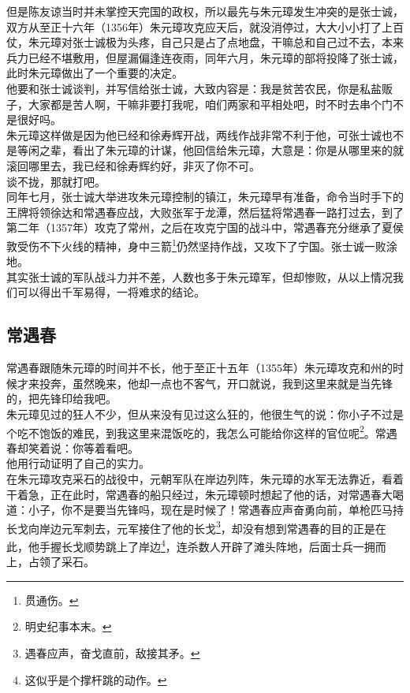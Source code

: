 \begin{multicols}{\theparacolNo}
但是陈友谅当时并未掌控天完国的政权，所以最先与朱元璋发生冲突的是张士诚，双方从至正十六年（1356年）朱元璋攻克应天后，就没消停过，大大小小打了上百仗，朱元璋对张士诚极为头疼，自己只是占了点地盘，干嘛总和自己过不去，本来兵力已经不堪敷用，但屋漏偏逢连夜雨，同年六月，朱元璋的部将投降了张士诚，此时朱元璋做出了一个重要的决定。\\

他要和张士诚谈判，并写信给张士诚，大致内容是：我是贫苦农民，你是私盐贩子，大家都是苦人啊，干嘛非要打我呢，咱们两家和平相处吧，时不时去串个门不是很好吗。\\

朱元璋这样做是因为他已经和徐寿辉开战，两线作战非常不利于他，可张士诚也不是等闲之辈，看出了朱元璋的计谋，他回信给朱元璋，大意是：你是从哪里来的就滚回哪里去，我已经和徐寿辉约好，非灭了你不可。\\

谈不拢，那就打吧。\\

同年七月，张士诚大举进攻朱元璋控制的镇江，朱元璋早有准备，命令当时手下的王牌将领徐达和常遇春应战，大败张军于龙潭，然后猛将常遇春一路打过去，到了第二年（1357年）攻克了常州，之后在攻克宁国的战斗中，常遇春充分继承了夏侯敦受伤不下火线的精神，身中三箭\footnote{贯通伤。}仍然坚持作战，又攻下了宁国。张士诚一败涂地。\\

其实张士诚的军队战斗力并不差，人数也多于朱元璋军，但却惨败，从以上情况我们可以得出千军易得，一将难求的结论。\\

\subsection{常遇春}
常遇春跟随朱元璋的时间并不长，他于至正十五年（1355年）朱元璋攻克和州的时候才来投奔，虽然晚来，他却一点也不客气，开口就说，我到这里来就是当先锋的，把先锋印给我吧。\\

朱元璋见过的狂人不少，但从来没有见过这么狂的，他很生气的说：你小子不过是个吃不饱饭的难民，到我这里来混饭吃的，我怎么可能给你这样的官位呢\footnote{明史纪事本末。}。常遇春却笑着说：你等着看吧。\\

他用行动证明了自己的实力。\\

在朱元璋攻克采石的战役中，元朝军队在岸边列阵，朱元璋的水军无法靠近，看着干着急，正在此时，常遇春的船只经过，朱元璋顿时想起了他的话，对常遇春大喝道：小子，你不是要当先锋吗，现在是时候了！常遇春应声奋勇向前，单枪匹马持长戈向岸边元军刺去，元军接住了他的长戈\footnote{遇春应声，奋戈直前，敌接其矛。}，却没有想到常遇春的目的正是在此，他手握长戈顺势跳上了岸边\footnote{这似乎是个撑杆跳的动作。}，连杀数人开辟了滩头阵地，后面士兵一拥而上，占领了采石。\\


\end{multicols}
